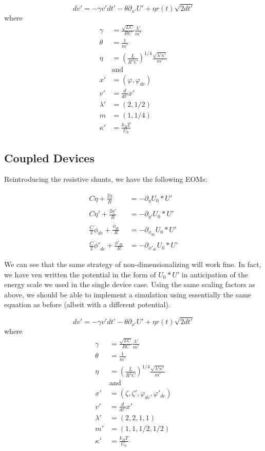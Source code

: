 \documentclass[paper=a4, twocolumn, fontsize=10pt]{article} %
\numberwithin{equation}{section} %
\numberwithin{figure}{section} %
\numberwithin{table}{section} %
\begin{document}
 \[ dv' = -\gamma v' dt' - \theta \partial_{x'} U' + \eta r(t) \sqrt{2dt'} \]
where
\begin{align*}
    \gamma &=  \frac{\sqrt{LC} }{ RC} \frac{\lambda'}{m'}  \\
    \theta &= \frac{1 }{ m'} \\
    \eta &= \left(  \frac{L}{R^2 C} \right)^{1/4} \frac{\sqrt{\lambda'\kappa'}}{m'} \\
    &\text{and} \\
    x' &= (\varphi, \varphi_{dc}) \\
    v' &= \frac{d}{dt'} x' \\
    \lambda' &= (2, 1/2) \\
    m &= ( 1, 1/4) \\
    \kappa' &= \frac{k_B T}{U_0}
\end{align*}

\subsection{Coupled Devices}

Reintroducing the resistive shunts, we have the following EOMs:

\begin{align*}
    C \ddot{\eta} + \frac{2 \dot{\eta}}{R} &= -\partial_{\eta} U_0 * U' \\
    C \ddot{\eta}' + \frac{2 \dot{\eta'}}{R}  &= -\partial_{\eta'} U_0 * U' \\
\frac{C}{2} \ddot{\phi}_{dc} + \frac{\dot{\phi_{dc}}}{R} &= -\partial_{\phi_{dc}} U_0 * U' \\
\frac{C}{2} \ddot{\phi'}_{dc} + \frac{\dot{\phi'_{dc}}}{R} &= -\partial_{\phi'_{dc}} U_0 * U'
\end{align*}

We can see that the same strategy of non-dimensionalizing will work fine. In fact, we have ven written the potential in the form of $U_0 * U'$ in anticipation of the energy scale we used in the single device case. Using the same scaling factors as above, we should be able to implement a simulation using essentially the same equation as before (albeit with a different potential).

\[ dv' = -\gamma v' dt' - \theta \partial_{x'} U' + \eta r(t) \sqrt{2dt'} \]
where
\begin{align*}
    \gamma &=  \frac{\sqrt{LC} }{ RC} \frac{\lambda'}{m'}  \\
    \theta &= \frac{1 }{ m'} \\
    \eta &= \left(  \frac{L}{R^2 C} \right)^{1/4} \frac{\sqrt{\lambda'\kappa'}}{m'} \\
    &\text{and} \\
    x' &= (\zeta, \zeta', \varphi_{dc}, \varphi'_{dc}) \\
    v' &= \frac{d}{dt'} x' \\
    \lambda' &= (2, 2, 1, 1) \\
    m' &= ( 1, 1, 1/2, 1/2) \\
    \kappa' &= \frac{k_B T}{U_0}
\end{align*}
\end{document}
